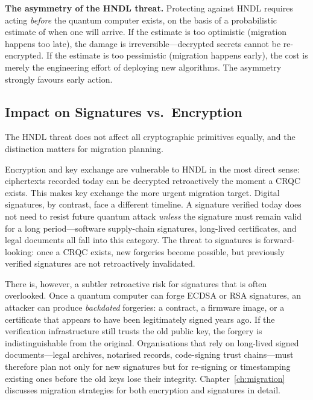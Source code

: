 \begin{svgraybox}
\textbf{The asymmetry of the HNDL threat.}  Protecting against HNDL requires acting \emph{before} the quantum computer exists, on the basis of a probabilistic estimate of when one will arrive.  If the estimate is too optimistic (migration happens too late), the damage is irreversible---decrypted secrets cannot be re-encrypted.  If the estimate is too pessimistic (migration happens early), the cost is merely the engineering effort of deploying new algorithms.  The asymmetry strongly favours early action.
\end{svgraybox}

\subsection{Impact on Signatures vs.\ Encryption}

The HNDL threat does not affect all cryptographic primitives equally, and the distinction matters for migration planning.

Encryption and key exchange are vulnerable to HNDL in the most direct sense: ciphertexts recorded today can be decrypted retroactively the moment a CRQC exists.  This makes key exchange the more urgent migration target.  Digital signatures, by contrast, face a different timeline.  A signature verified today does not need to resist future quantum attack \emph{unless} the signature must remain valid for a long period---software supply-chain signatures, long-lived certificates, and legal documents all fall into this category.  The threat to signatures is forward-looking: once a CRQC exists, new forgeries become possible, but previously verified signatures are not retroactively invalidated.

There is, however, a subtler retroactive risk for signatures that is often overlooked.  Once a quantum computer can forge ECDSA or RSA signatures, an attacker can produce \emph{backdated} forgeries: a contract, a firmware image, or a certificate that appears to have been legitimately signed years ago.  If the verification infrastructure still trusts the old public key, the forgery is indistinguishable from the original.  Organisations that rely on long-lived signed documents---legal archives, notarised records, code-signing trust chains---must therefore plan not only for new signatures but for re-signing or timestamping existing ones before the old keys lose their integrity.  Chapter~\ref{ch:migration} discusses migration strategies for both encryption and signatures in detail.

